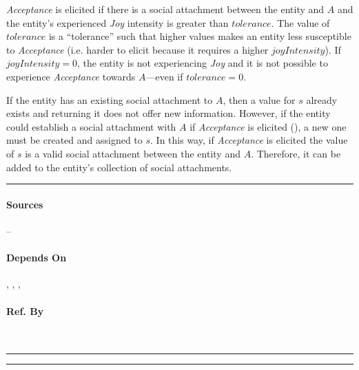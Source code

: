 \textit{Acceptance} is elicited if there is a social attachment between the
entity and $A$ and the entity's experienced \textit{Joy} intensity is greater
than $\mathit{tolerance}$. The value of $\mathit{tolerance}$ is a ``tolerance''
such that higher values makes an entity less susceptible to \textit{Acceptance}
(i.e. harder to elicit because it requires a higher $\mathit{joyIntensity}$).
If $\mathit{joyIntensity} = 0$, the entity is not experiencing \textit{Joy} and
it is not possible to experience \textit{Acceptance} towards $A$---even if
$\mathit{tolerance} = 0$.

If the entity has an existing social attachment to $A$, then a value for $s$
already exists and returning it does not offer new information. However, if the
entity could establish a social attachment with $A$ if \textit{Acceptance} is
elicited (), a new one must be created and
assigned to $s$. In this way, if \textit{Acceptance} is elicited the value of
$s$ is a valid social attachment between the entity and $A$. Therefore, it can
be added to the entity's collection of social attachments. \\\hrule

\paragraph{Sources} --

\paragraph{Depends On} ,
, , 

\paragraph{Ref. By}  \\\hrule\vspace{0.5mm}\hrule

~\newline

